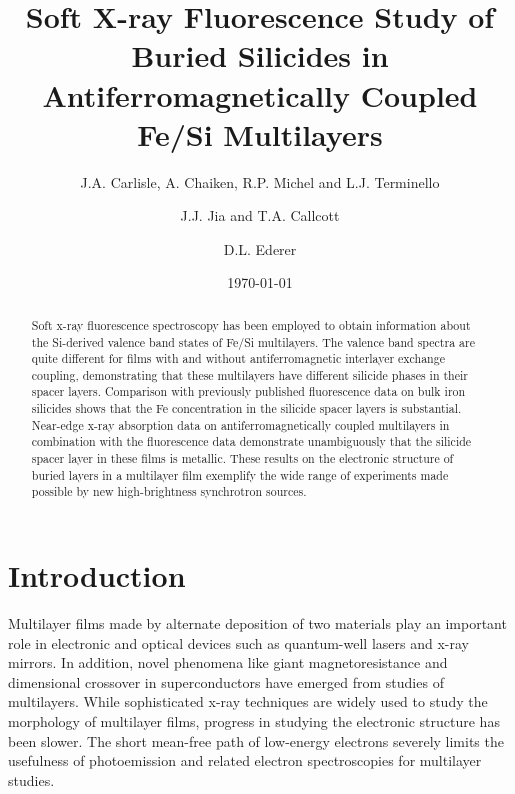 
\draft \title{Soft X-ray Fluorescence Study 
of Buried Silicides in Antiferromagnetically Coupled Fe/Si Multilayers}
\author{J.A. Carlisle, A. Chaiken, R.P. Michel and L.J. Terminello} 
\address{Materials Science and Technology
Division\\Lawrence Livermore National Lab\\Livermore, CA 94551}
\author{J.J. Jia and  T.A. Callcott}
\address{University of Tennessee\\Knoxville, TN 37996}
\author{D.L. Ederer}
\address{Tulane University\\New Orleans, LA  70118}
\date{\today}

\maketitle

\begin{abstract}
Soft x-ray fluorescence spectroscopy has been employed to obtain
information about the Si-derived valence band states of Fe/Si
multilayers.  The valence band spectra are quite different for films
with and without antiferromagnetic interlayer exchange coupling,
demonstrating that these multilayers have different silicide phases in
their spacer layers.  Comparison with previously published
fluorescence data on bulk iron silicides shows that the Fe
concentration in the silicide spacer layers is substantial.  Near-edge
x-ray absorption data on antiferromagnetically coupled multilayers in
combination with the fluorescence data demonstrate unambiguously that
the silicide spacer layer in these films is metallic.  These results
on the electronic structure of buried layers in a multilayer film
exemplify the wide range of experiments made possible by new
high-brightness synchrotron sources.

\end{abstract}

\clearpage

\section{Introduction}

Multilayer films made by alternate deposition of two materials play an
important role in electronic and optical devices such as quantum-well
lasers and x-ray mirrors.\cite{chang} In addition, novel phenomena
like giant magnetoresistance and dimensional crossover in
superconductors have emerged from studies of multilayers.  While
sophisticated x-ray techniques are widely used to study the morphology
of multilayer films, progress in studying the electronic structure has
been slower.  The short mean-free path of low-energy electrons
severely limits the usefulness of photoemission and related electron
spectroscopies for multilayer studies.

